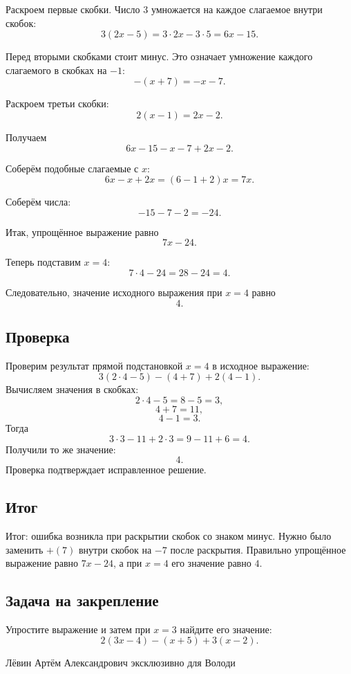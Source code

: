\documentclass[12pt,a4paper]{article}
\begin{document}
Раскроем первые скобки. Число $3$ умножается на каждое слагаемое внутри скобок:
\[
3(2x-5)=3\cdot2x-3\cdot5=6x-15.
\]

Перед вторыми скобками стоит минус. Это означает умножение каждого слагаемого в скобках на $-1$:
\[
-(x+7)=-x-7.
\]

Раскроем третьи скобки:
\[
2(x-1)=2x-2.
\]

Получаем
\[
6x-15-x-7+2x-2.
\]

Соберём подобные слагаемые с $x$:
\[
6x-x+2x=(6-1+2)x=7x.
\]

Соберём числа:
\[
-15-7-2=-24.
\]

Итак, упрощённое выражение равно
\[
\boxed{7x-24}.
\]

Теперь подставим $x=4$:
\[
7\cdot4-24=28-24=4.
\]

Следовательно, значение исходного выражения при $x=4$ равно
\[
\boxed{4}.
\]

\subsection*{Проверка}
Проверим результат прямой подстановкой $x=4$ в исходное выражение:
\[
3(2\cdot4-5)-(4+7)+2(4-1).
\]
Вычисляем значения в скобках:
\[
2\cdot4-5=8-5=3,
\]
\[
4+7=11,
\]
\[
4-1=3.
\]
Тогда
\[
3\cdot3-11+2\cdot3=9-11+6=4.
\]
Получили то же значение:
\[
4.
\]
Проверка подтверждает исправленное решение.

\subsection*{Итог}
\textcolor{teal!60!black}{Итог:} ошибка возникла при раскрытии скобок со знаком минус. Нужно было заменить $+(7)$ внутри скобок на $-7$ после раскрытия. Правильно упрощённое выражение равно $7x-24$, а при $x=4$ его значение равно $4$.

\subsection*{Задача на закрепление}
Упростите выражение и затем при $x=3$ найдите его значение:
\[
2(3x-4)-(x+5)+3(x-2).
\]

\vfill
\begin{center}
\small Лёвин Артём Александрович эксклюзивно для Володи
\end{center}
\end{document}
